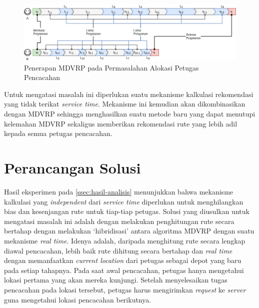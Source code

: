 \begin{figure}[!]
	\centering
	\includegraphics[width=\textwidth]{Resources/Images/illustration-timeline-mdvrp}
	\caption{Penerapan MDVRP pada Permasalahan Alokasi Petugas Pencacahan}
	\label{fig:illustration-timeline-mdvrp}
\end{figure}


Untuk mengatasi masalah ini diperlukan suatu mekanisme kalkulasi rekomendasi yang tidak terikat \textit{service time}. Mekanisme ini kemudian akan dikombinasikan dengan MDVRP sehingga menghasilkan suatu metode baru yang dapat menutupi kelemahan MDVRP sekaligus memberikan rekomendasi rute yang lebih adil kepada semua petugas pencacahan. 


\section{Perancangan Solusi}
\label{sec:design}
Hasil eksperimen pada \autoref{ssec:hasil-analisis} menunjukkan bahwa mekanisme kalkulasi yang \textit{independent} dari \textit{service time} diperlukan untuk menghilangkan bias dan kesenjangan rute untuk tiap-tiap petugas. Solusi yang diusulkan untuk mengatasi masalah ini adalah dengan melakukan penghitungan rute secara bertahap dengan melakukan `hibridisasi' antara algoritma MDVRP dengan suatu mekanisme \textit{real time}. Idenya adalah, daripada menghitung rute secara lengkap diawal pencacahan, lebih baik rute dihitung secara bertahap dan \textit{real time} dengan memanfaatkan \textit{current location} dari petugas sebagai depot yang baru pada setiap tahapnya. Pada saat awal pencacahan, petugas hanya mengetahui lokasi pertama yang akan mereka kunjungi. Setelah menyelesaikan tugas pencacahan pada lokasi tersebut, petugas harus mengirimkan \textit{request} ke \textit{server} guna mengetahui lokasi pencacahan berikutnya.

